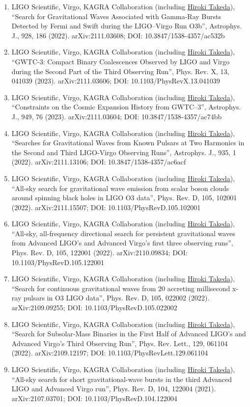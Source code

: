 \documentclass[uplatex, 12pt]{article}
\begin{document}
\begin{enumerate}
\item LIGO Scientific, Virgo, KAGRA Collaboration (including \uline{Hiroki Takeda}), “Search for Gravitational Waves Associated with Gamma-Ray Bursts Detected by Fermi and Swift during the LIGO–Virgo Run O3b”, Astrophys. J., 928, 186 (2022). arXiv:2111.03608; DOI: 10.3847/1538-4357/ac532b
\item LIGO Scientific, Virgo, KAGRA Collaboration (including \uline{Hiroki Takeda}), “GWTC-3: Compact Binary Coalescences Observed by LIGO and Virgo during the Second Part of the Third Observing Run”, Phys. Rev. X, 13, 041039 (2023). arXiv:2111.03606; DOI: 10.1103/PhysRevX.13.041039
\item LIGO Scientific, Virgo, KAGRA Collaboration (including \uline{Hiroki Takeda}), “Constraints on the Cosmic Expansion History from GWTC–3”, Astrophys. J., 949, 76 (2023). arXiv:2111.03604; DOI: 10.3847/1538-4357/ac74bb
\item LIGO Scientific, Virgo, KAGRA Collaboration (including \uline{Hiroki Takeda}), “Searches for Gravitational Waves from Known Pulsars at Two Harmonics in the Second and Third LIGO-Virgo Observing Runs”, Astrophys. J., 935, 1 (2022). arXiv:2111.13106; DOI: 10.3847/1538-4357/ac6acf
\item LIGO Scientific, Virgo, KAGRA Collaboration (including \uline{Hiroki Takeda}), “All-sky search for gravitational wave emission from scalar boson clouds around spinning black holes in LIGO O3 data”, Phys. Rev. D, 105, 102001 (2022). arXiv:2111.15507; DOI: 10.1103/PhysRevD.105.102001
\item LIGO Scientific, Virgo, KAGRA Collaboration (including \uline{Hiroki Takeda}), “All-sky, all-frequency directional search for persistent gravitational waves from Advanced LIGO's and Advanced Virgo's first three observing runs”, Phys. Rev. D, 105, 122001 (2022). arXiv:2110.09834; DOI: 10.1103/PhysRevD.105.122001
\item LIGO Scientific, Virgo, KAGRA Collaboration (including \uline{Hiroki Takeda}), “Search for continuous gravitational waves from 20 accreting millisecond
x-ray pulsars in O3 LIGO data”, Phys. Rev. D, 105, 022002 (2022). arXiv:2109.09255; DOI: 10.1103/PhysRevD.105.022002
\item LIGO Scientific, Virgo, KAGRA Collaboration (including \uline{Hiroki Takeda}), “Search for Subsolar-Mass Binaries in the First Half of Advanced LIGO's and Advanced Virgo's Third Observing Run”, Phys. Rev. Lett., 129, 061104 (2022). arXiv:2109.12197; DOI: 10.1103/PhysRevLett.129.061104
\item LIGO Scientific, Virgo, KAGRA Collaboration (including \uline{Hiroki Takeda}), “All-sky search for short gravitational-wave bursts in the third Advanced LIGO and Advanced Virgo run”, Phys. Rev. D, 104, 122004 (2021). arXiv:2107.03701; DOI: 10.1103/PhysRevD.104.122004

\end{enumerate}
\end{document}
